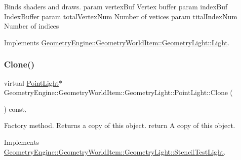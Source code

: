 Binds shaders and draws. param vertex\+Buf Vertex buffer param index\+Buf Index\+Buffer param total\+Vertex\+Num Number of vetices param tital\+Index\+Num Number of indices 

Implements \mbox{\hyperlink{class_geometry_engine_1_1_geometry_world_item_1_1_geometry_light_1_1_light_a58aa2a3520f7aa2b03afcb4123e7530a}{Geometry\+Engine\+::\+Geometry\+World\+Item\+::\+Geometry\+Light\+::\+Light}}.

\mbox{\label{class_geometry_engine_1_1_geometry_world_item_1_1_geometry_light_1_1_point_light_a68321b758cff76fa55f3cd5ef2824035}} 
\subsubsection{\texorpdfstring{Clone()}{Clone()}}
{\footnotesize\ttfamily virtual \mbox{\hyperlink{class_geometry_engine_1_1_geometry_world_item_1_1_geometry_light_1_1_point_light}{Point\+Light}}$\ast$ Geometry\+Engine\+::\+Geometry\+World\+Item\+::\+Geometry\+Light\+::\+Point\+Light\+::\+Clone (\begin{DoxyParamCaption}{ }\end{DoxyParamCaption}) const\hspace{0.3cm}{\ttfamily [inline]}, {\ttfamily [virtual]}}

Factory method. Returns a copy of this object. return A copy of this object. 

Implements \mbox{\hyperlink{class_geometry_engine_1_1_geometry_world_item_1_1_geometry_light_1_1_stencil_test_light_a6434a228dc64537ff9984c82eaf8ab07}{Geometry\+Engine\+::\+Geometry\+World\+Item\+::\+Geometry\+Light\+::\+Stencil\+Test\+Light}}.

\mbox{\label{class_geometry_engine_1_1_geometry_world_item_1_1_geometry_light_1_1_point_light_ab0ed78036120211285fffdde1408352e}} 

